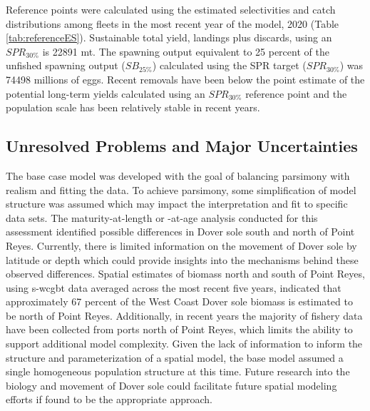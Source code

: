 \documentclass[11pt,
  english,
  a4paper,
]{article}
\begin{document}
Reference points were calculated using the estimated selectivities and catch distributions among fleets in the most recent year of the model, 2020 (Table \ref{tab:referenceES}). Sustainable total yield, landings plus discards, using an {\(SPR_{30\%}\)\leavevmode\tagmcend\tagstructend} is 22891 mt. The spawning output equivalent to 25 percent of the unfished spawning output ({\(SB_{25\%}\)\leavevmode\tagmcend\tagstructend}) calculated using the SPR target ({\(SPR_{30\%}\)\leavevmode\tagmcend\tagstructend}) was 74498 millions of eggs. Recent removals have been below the point estimate of the potential long-term yields calculated using an {\(SPR_{30\%}\)\leavevmode\tagmcend\tagstructend} reference point and the population scale has been relatively stable in recent years.

\leavevmode\tagmcend\tagstructend\par


\hypertarget{unresolved-problems-and-major-uncertainties-1}{%
\subsection{Unresolved Problems and Major Uncertainties}\label{unresolved-problems-and-major-uncertainties-1}}

\leavevmode\tagmcend\tagstructend


The base case model was developed with the goal of balancing parsimony with realism and fitting the data. To achieve parsimony, some simplification of model structure was assumed which may impact the interpretation and fit to specific data sets. The maturity-at-length or -at-age analysis conducted for this assessment identified possible differences in Dover sole south and north of Point Reyes. Currently, there is limited information on the movement of Dover sole by latitude or depth which could provide insights into the mechanisms behind these observed differences. Spatial estimates of biomass north and south of Point Reyes, using \gls{s-wcgbt} data averaged across the most recent five years, indicated that approximately 67 percent of the West Coast Dover sole biomass is estimated to be north of Point Reyes. Additionally, in recent years the majority of fishery data have been collected from ports north of Point Reyes, which limits the ability to support additional model complexity. Given the lack of information to inform the structure and parameterization of a spatial model, the base model assumed a single homogeneous population structure at this time. Future research into the biology and movement of Dover sole could facilitate future spatial modeling efforts if found to be the appropriate approach.
\end{document}
